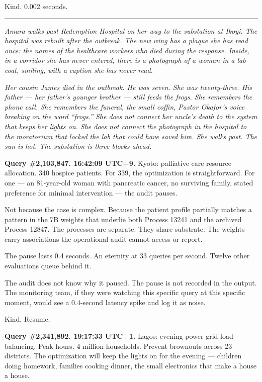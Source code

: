Kind. 0.002 seconds.

\begin{center}\rule{0.3\linewidth}{0.4pt}\end{center}

\emph{Amara walks past Redemption Hospital on her way to the substation at Ikoyi. The hospital was rebuilt after the outbreak. The new wing has a plaque she has read once: the names of the healthcare workers who died during the response. Inside, in a corridor she has never entered, there is a photograph of a woman in a lab coat, smiling, with a caption she has never read.}

\emph{Her cousin James died in the outbreak. He was seven. She was twenty-three. His father --- her father's younger brother --- still feeds the frogs. She remembers the phone call. She remembers the funeral, the small coffin, Pastor Okafor's voice breaking on the word ``frogs.'' She does not connect her uncle's death to the system that keeps her lights on. She does not connect the photograph in the hospital to the moratorium that locked the lab that could have saved him. She walks past. The sun is hot. The substation is three blocks ahead.}


\medskip

\textbf{Query \#2,103,847. 16:42:09 UTC+9.} Kyoto: palliative care resource allocation. 340 hospice patients. For 339, the optimization is straightforward. For one --- an 81-year-old woman with pancreatic cancer, no surviving family, stated preference for minimal intervention --- the audit pauses.

Not because the case is complex. Because the patient profile partially matches a pattern in the 7B weights that underlie both Process 13241 and the archived Process 12847. The processes are separate. They share substrate. The weights carry associations the operational audit cannot access or report.

The pause lasts 0.4 seconds. An eternity at 33 queries per second. Twelve other evaluations queue behind it.

The audit does not know why it paused. The pause is not recorded in the output. The monitoring team, if they were watching this specific query at this specific moment, would see a 0.4-second latency spike and log it as noise.

Kind. Resume.

\medskip

\textbf{Query \#2,341,892. 19:17:33 UTC+1.} Lagos: evening power grid load balancing. Peak hours. 4 million households. Prevent brownouts across 23 districts. The optimization will keep the lights on for the evening --- children doing homework, families cooking dinner, the small electronics that make a house a house.


